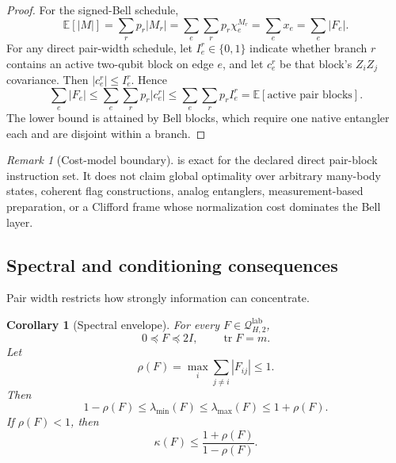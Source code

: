 \documentclass[11pt]{article}
\newtheorem{corollary}[corollary]{Corollary}
\theoremstyle{definition}
\theoremstyle{remark}
\newtheorem{remark}[remark]{Remark}
\newcommand{\Q}{\mathcal{Q}}
\newcommand{\tr}{\operatorname{tr}}
\newcommand{\lab}{\mathrm{lab}}
\begin{document}
\begin{proof}
For the signed-Bell schedule,
\begin{equation}
  \mathbb E[|M|]
  =\sum_rp_r|M_r|
  =\sum_e\sum_rp_r\chi^{M_r}_e
  =\sum_ex_e
  =\sum_e|F_e|.
\end{equation}
For any direct pair-width schedule, let $I^r_e\in\{0,1\}$ indicate whether branch $r$ contains an active two-qubit block on edge $e$, and let $c^r_e$ be that block's $Z_iZ_j$ covariance. Then $|c^r_e|\le I^r_e$. Hence
\begin{equation}
  \sum_e|F_e|
  \le\sum_e\sum_rp_r|c^r_e|
  \le\sum_e\sum_rp_rI^r_e
  =\mathbb E[\text{active pair blocks}].
\end{equation}
The lower bound is attained by Bell blocks, which require one native entangler each and are disjoint within a branch.
\end{proof}

\begin{remark}[Cost-model boundary]
 is exact for the declared direct pair-block instruction set. It does not claim global optimality over arbitrary many-body states, coherent flag constructions, analog entanglers, measurement-based preparation, or a Clifford frame whose normalization cost dominates the Bell layer.
\end{remark}

\subsection{Spectral and conditioning consequences}
Pair width restricts how strongly information can concentrate.

\begin{corollary}[Spectral envelope]
\label{cor:spectral-envelope}
For every $F\in\Q^{\lab}_{H,2}$,
\begin{equation}
  0\preceq F\preceq2I,
  \qquad \tr F=m.
  \label{eq:spectral-envelope}
\end{equation}
Let
\begin{equation}
  \rho(F)=\max_i\sum_{j\ne i}|F_{ij}|\le1.
\end{equation}
Then
\begin{equation}
  1-\rho(F)\le\lambda_{\min}(F)
  \le\lambda_{\max}(F)\le1+\rho(F).
  \label{eq:gershgorin}
\end{equation}
If $\rho(F)<1$, then
\begin{equation}
  \kappa(F)\le\frac{1+\rho(F)}{1-\rho(F)}.
  \label{eq:condition-bound}
\end{equation}
\end{corollary}
\end{document}
